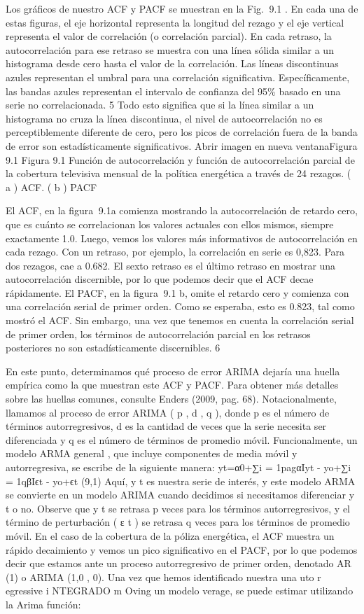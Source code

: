 \documentclass[
]{book}
\begin{document}
Los gráficos de nuestro ACF y PACF se muestran en la Fig.  9.1 . En cada una de estas figuras, el eje horizontal representa la longitud del rezago y el eje vertical representa el valor de correlación (o correlación parcial). En cada retraso, la autocorrelación para ese retraso se muestra con una línea sólida similar a un histograma desde cero hasta el valor de la correlación. Las líneas discontinuas azules representan el umbral para una correlación significativa. Específicamente, las bandas azules representan el intervalo de confianza del 95\% basado en una serie no correlacionada. 5 Todo esto significa que si la línea similar a un histograma no cruza la línea discontinua, el nivel de autocorrelación no es perceptiblemente diferente de cero, pero los picos de correlación fuera de la banda de error son estadísticamente significativos.
Abrir imagen en nueva ventanaFigura 9.1
Figura 9.1
Función de autocorrelación y función de autocorrelación parcial de la cobertura televisiva mensual de la política energética a través de 24 rezagos. ( a ) ACF. ( b ) PACF

El ACF, en la figura  9.1a comienza mostrando la autocorrelación de retardo cero, que es cuánto se correlacionan los valores actuales con ellos mismos, siempre exactamente 1.0. Luego, vemos los valores más informativos de autocorrelación en cada rezago. Con un retraso, por ejemplo, la correlación en serie es 0,823. Para dos rezagos, cae a 0.682. El sexto retraso es el último retraso en mostrar una autocorrelación discernible, por lo que podemos decir que el ACF decae rápidamente. El PACF, en la figura  9.1 b, omite el retardo cero y comienza con una correlación serial de primer orden. Como se esperaba, esto es 0.823, tal como mostró el ACF. Sin embargo, una vez que tenemos en cuenta la correlación serial de primer orden, los términos de autocorrelación parcial en los retrasos posteriores no son estadísticamente discernibles. 6

En este punto, determinamos qué proceso de error ARIMA dejaría una huella empírica como la que muestran este ACF y PACF. Para obtener más detalles sobre las huellas comunes, consulte Enders (2009, pag. 68). Notacionalmente, llamamos al proceso de error ARIMA ( p , d , q ), donde p es el número de términos autorregresivos, d es la cantidad de veces que la serie necesita ser diferenciada y q es el número de términos de promedio móvil. Funcionalmente, un modelo ARMA general , que incluye componentes de media móvil y autorregresiva, se escribe de la siguiente manera:
yt=α0+∑i = 1pagαIyt - yo+∑i = 1qβIϵt - yo+ϵt
(9,1)
Aquí, y t es nuestra serie de interés, y este modelo ARMA se convierte en un modelo ARIMA cuando decidimos si necesitamos diferenciar y t o no. Observe que y t se retrasa p veces para los términos autorregresivos, y el término de perturbación ( ε t ) se retrasa q veces para los términos de promedio móvil. En el caso de la cobertura de la póliza energética, el ACF muestra un rápido decaimiento y vemos un pico significativo en el PACF, por lo que podemos decir que estamos ante un proceso autorregresivo de primer orden, denotado AR (1) o ARIMA (1,0 , 0).
Una vez que hemos identificado nuestra una uto r egressive i NTEGRADO m Oving un modelo verage, se puede estimar utilizando la Arima función:
\end{document}
